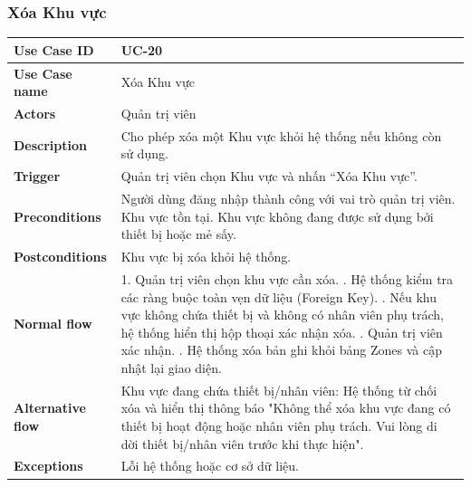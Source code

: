 \subsubsection{ Xóa Khu vực}
\begin{tabular}{|p{3.5cm}|p{9.5cm}|}
\hline
\textbf{Use Case ID} & UC-20 \\
\hline
\textbf{Use Case name} & Xóa Khu vực \\
\hline
\textbf{Actors} & Quản trị viên \\
\hline
\textbf{Description} & 
Cho phép xóa một Khu vực khỏi hệ thống nếu không còn sử dụng. \\
\hline
\textbf{Trigger} & 
Quản trị viên chọn Khu vực và nhấn “Xóa Khu vực”. \\
\hline
\textbf{Preconditions} & 
Người dùng đăng nhập thành công với vai trò
quản trị viên.\newline
Khu vực tồn tại.\newline
Khu vực không đang được sử dụng bởi thiết bị
hoặc mẻ sấy.
 \\
\hline
\textbf{Postconditions} & 
Khu vực bị xóa khỏi hệ thống. \\
\hline
\textbf{Normal flow} & 
1. Quản trị viên chọn khu vực cần xóa. \newline
2. Hệ thống kiểm tra các ràng buộc toàn vẹn dữ liệu (Foreign Key). \newline
3. Nếu khu vực không chứa thiết bị và không có nhân viên phụ trách, hệ thống hiển thị hộp thoại xác nhận xóa. \newline
4. Quản trị viên xác nhận. \newline
5. Hệ thống xóa bản ghi khỏi bảng Zones và cập nhật lại giao diện.
 \\
\hline
\textbf{Alternative flow} & 
Khu vực đang chứa thiết bị/nhân viên: Hệ thống từ chối xóa và hiển thị thông báo "Không thể xóa khu vực đang có thiết bị hoạt động hoặc nhân viên phụ trách. Vui lòng di dời thiết bị/nhân viên trước khi thực hiện". \\
\hline
\textbf{Exceptions} & 
Lỗi hệ thống hoặc cơ sở dữ liệu. \\
\hline
\end{tabular}


